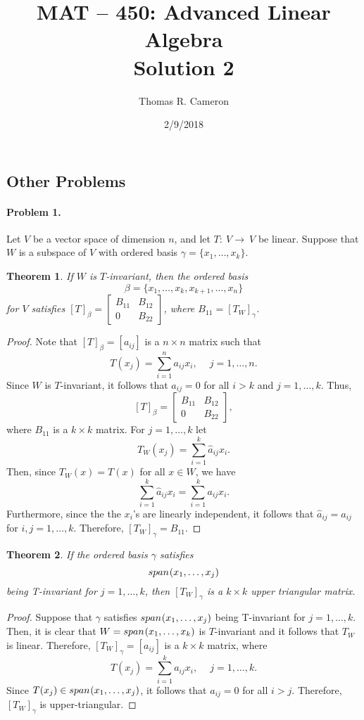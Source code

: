 \documentclass{article}
\title{MAT -- 450: Advanced Linear Algebra\\
\large{Solution 2}}
\author{Thomas R. Cameron}
\date{2/9/2018}
\newtheorem{theorem}{Theorem}
\newcommand{\spn}{{span\mkern1mu}}
\begin{document}
\maketitle

\subsection*{Other Problems}

\paragraph*{Problem 1.}	Let $V$ be a vector space of dimension $n$, and let $T\colon~V\rightarrow~V$ be linear. Suppose that $W$ is a subspace of $V$ with ordered basis $\gamma=\{x_{1},\ldots,x_{k}\}$.
\begin{theorem}
If $W$ is $T$-invariant, then the ordered basis 
\[
\beta=\{x_{1},\ldots,x_{k},x_{k+1},\ldots,x_{n}\}
\] 
for $V$ satisfies $[T]_{\beta}=\begin{bmatrix}B_{11} & B_{12}\\ 0 & B_{22}\end{bmatrix}$, where $B_{11}=[T_{W}]_{\gamma}$. 
\end{theorem}
\begin{proof}
Note that $[T]_{\beta}=[a_{ij}]$ is a $n\times n$ matrix such that
\[
T(x_{j})=\sum_{i=1}^{n}a_{ij}x_{i},\quad~j=1,\ldots,n.
\]
Since $W$ is $T$-invariant, it follows that $a_{ij}=0$ for all $i>k$ and $j=1,\ldots,k$. Thus,
\[
[T]_{\beta}=\begin{bmatrix}B_{11} & B_{12}\\ 0 & B_{22}\end{bmatrix},
\]
where $B_{11}$ is a $k\times k$ matrix. For $j=1,\ldots,k$ let
\[
T_{W}(x_{j})=\sum_{i=1}^{k}\hat{a}_{ij}x_{i}.
\]
Then, since $T_{W}(x)=T(x)$ for all $x\in W$, we have
\[
\sum_{i=1}^{k}\hat{a}_{ij}x_{i}=\sum_{i=1}^{k}a_{ij}x_{i}.
\]
Furthermore, since the the $x_{i}$'s are linearly independent, it follows that $\hat{a}_{ij}=a_{ij}$ for $i,j=1,\ldots,k$. Therefore, $[T_{W}]_{\gamma}=B_{11}$. 
\end{proof}
\begin{theorem}
If the ordered basis $\gamma$ satisfies 
\[
\spn(x_{1},\ldots,x_{j})
\]
being T-invariant for $j=1,\ldots,k$, then $[T_{W}]_{\gamma}$ is a $k\times k$ upper triangular matrix. 
\end{theorem}
\begin{proof}
Suppose that $\gamma$ satisfies $\spn(x_{1},\ldots,x_{j})$ being T-invariant for $j=1,\ldots,k$. Then, it is clear that $W=\spn(x_{1},\ldots,x_{k})$ is $T$-invariant and it follows that $T_{W}$ is linear. Therefore, $[T_{W}]_{\gamma}=[a_{ij}]$ is a $k\times k$ matrix, where
\[
T(x_{j})=\sum_{i=1}^{k}a_{ij}x_{i},\quad~j=1,\ldots,k.
\]
Since $T(x_{j})\in\spn(x_{1},\ldots,x_{j})$, it follows that $a_{ij}=0$ for all $i>j$. Therefore, $[T_{W}]_{\gamma}$ is upper-triangular. 
\end{proof}
\end{document}
